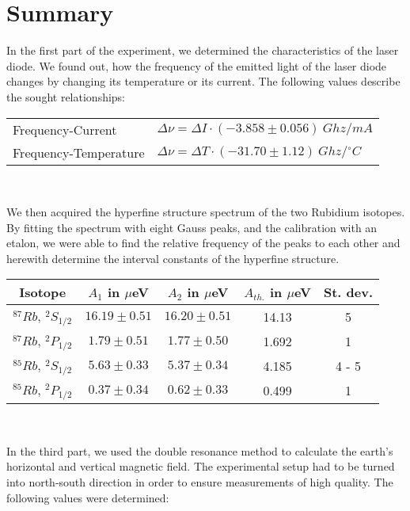 \clearpage
\section{Summary}

In the first part of the experiment, we determined the characteristics of the laser diode. We found out, how the frequency of the emitted light of the laser diode changes by changing its temperature or its current. The following values describe the sought relationships:

\begin{center}
\begin{tabular}[H]{l l}
Frequency-Current & $\Delta\nu = \Delta I \cdot (-3.858 \pm 0.056)\ {Ghz}/{mA}$\\
Frequency-Temperature & $\Delta\nu = \Delta T \cdot (-31.70 \pm 1.12)\ {Ghz}/{^\circ C}$\\
\end{tabular}\\
\end{center}

We then acquired the hyperfine structure spectrum of the two Rubidium isotopes. By fitting the spectrum with eight Gauss peaks, and the calibration with an etalon, we were able to find the relative frequency of the peaks to each other and herewith determine the interval constants of the hyperfine structure.

\begin{center}
\begin{tabular}[H]{| c | c c c c |} \hline
Isotope & $A_1$ in $\mu$eV & $A_2$ in $\mu$eV & $A_{th.}$ in $\mu$eV & St. dev.\\ \hline
$^{87}Rb$, $^2S_{1/2}$ & $16.19 \pm 0.51$ & $16.20 \pm 0.51$ & 14.13  & 5 \\
$^{87}Rb$, $^2P_{1/2}$ & $1.79 \pm 0.51$ &  $1.77 \pm 0.50$ & 1.692   & 1 \\
$^{85}Rb$, $^2S_{1/2}$ & $5.63 \pm 0.33$ &  $5.37 \pm 0.34$ & 4.185   & 4 - 5 \\
$^{85}Rb$, $^2P_{1/2}$ & $0.37 \pm 0.34$ &  $0.62 \pm 0.33$ & 0.499   & 1 \\ \hline
\end{tabular}\\
\end{center}

In the third part, we used the double resonance method to calculate the earth's horizontal and vertical magnetic field. The experimental setup had to be turned into north-south direction in order to ensure measurements of high quality. The following values were determined:

